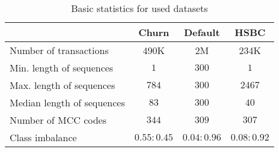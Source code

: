 

\begin{table}[!t]
\caption{Basic statistics for used datasets}
\label{tab:datasets}
\centering
\begin{tabular}{p{2.2cm}ccc}
\hline
~ & Churn & Default & HSBC\\
\hline
Number of transactions & 490K & 2M & 234K \\
Min. length of sequences & $1$ & $300$ & $1$ \\
Max. length of sequences & $784$ & $300$ & $2467$ \\
Median length of sequences & $83$ & $300$ & $40$ \\
Number of MCC codes & $344$ & $309$ & $307$ \\ 
Class imbalance & $0.55 : 0.45$ & $0.04 : 0.96$ & $0.08 : 0.92$ \\
\hline
\end{tabular}
\end{table}



